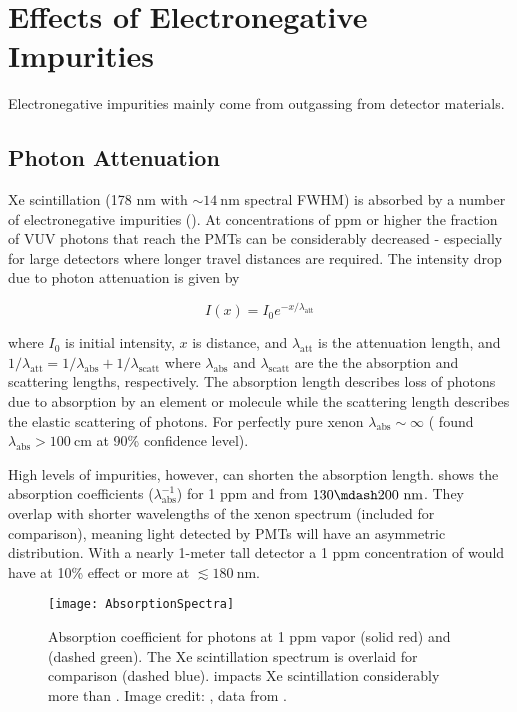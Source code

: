 \section{Effects of Electronegative Impurities}
\label{sec:importance_procedure_effects}
Electronegative impurities mainly come from outgassing from detector materials.

\subsection{Photon Attenuation}
\label{subsec:importance_procedure_effects_photons}
Xe scintillation (178 nm with ${\sim} 14\ \mathrm{nm}$ spectral FWHM) is absorbed by a number of electronegative impurities
().  At concentrations of ppm or higher
the fraction of VUV photons that reach the PMTs can be considerably decreased - especially for large detectors where longer travel
distances are required.  The intensity drop due to photon attenuation is given by

\begin{equation}
I(x) = I_0 e^{-x / \lambda_{\mathrm{att}}}
\end{equation}

\noindent where $I_0$ is initial intensity, $x$ is distance, and $\lambda_{\mathrm{att}}$ is the attenuation length, and
$1 / \lambda_{\mathrm{att}} = 1 / \lambda_{\mathrm{abs}} + 1 / \lambda_{\mathrm{scatt}}$ where $\lambda_{\mathrm{abs}}$ and
$\lambda_{\mathrm{scatt}}$ are the the absorption and scattering lengths, respectively.  The absorption length describes loss of
photons due to absorption by an element or molecule while the scattering length describes the elastic scattering of photons.  For
perfectly pure xenon
$\lambda_{\mathrm{abs}} \sim \infty$ ( found $\lambda_{\mathrm{abs}} > 100\ \mathrm{cm}$ at 90\% confidence
level).

High levels of impurities, however, can shorten the absorption
length.   shows the absorption coefficients
($\lambda_{\mathrm{abs}}^{-1}$) for 1 ppm \htwoo and \otwo from $130 \mdash 200\ \mathrm{nm}$.  They overlap with shorter wavelengths
of the xenon spectrum (included for comparison), meaning light detected by PMTs will have an asymmetric distribution.  With a nearly
1-meter tall detector a 1 ppm concentration of \htwoo would have at 10\% effect or more at $\lesssim 180\ \mathrm{nm}$.

\begin{figure}
\centering
\texttt{[image: AbsorptionSpectra]}
\caption{Absorption coefficient for photons at 1 ppm  vapor (solid red) and  (dashed green).  The Xe scintillation
spectrum is overlaid for comparison (dashed blue).   impacts Xe scintillation considerably
more than .  Image credit: ,  data from .}
\label{fig:importance_procedure_effects_photons_absorption_coefficents}
\end{figure}


